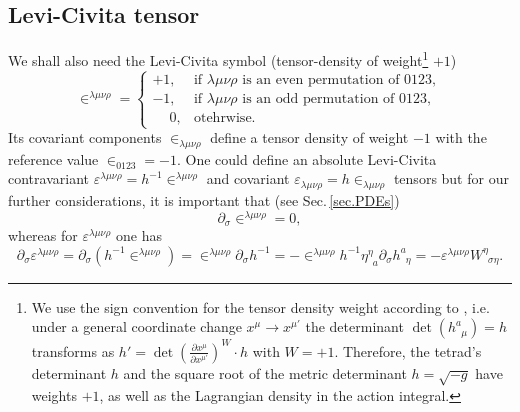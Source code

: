 \documentclass[
10pt, %
a4paper, %
oneside, %
headinclude,footinclude, %
BCOR5mm, %
]{scrartcl}
\newcommand{\pd}[1]{\partial_{#1}}
\newcommand{\tetrsymbol}{h}
\newcommand{\itetrsymbol}{\eta}
\newcommand{\itetr}[2]{\itetrsymbol^{#1}_{\phantom{#1}#2}}
\newcommand{\tetr}[2]{\tetrsymbol^{#1}_{\phantom{#1}#2}}
\newcommand{\detTetr}{\tetrsymbol}
\newcommand{\D}[1]{\partial_{#1}} %
\newcommand{\w}[2]{W^{#1}_{\phantom{#1}#2}}
\newcommand{\LCsymb}{\bm{\in}}    %
\newcommand{\LCtens}{\varepsilon} %
\begin{document}
\subsection{Levi-Civita tensor}


We shall also need the Levi-Civita symbol (tensor-density of weight\footnote{We 
	use the 
	sign convention for the tensor density weight according to \cite{Ryder2009,Grinfeld2013}, i.e.
	under a 
	general 
	coordinate change $ x^\mu \to x^{\mu'} $ the determinant $ \det(\tetr{a}{\mu}) = \detTetr $ 
	transforms as $ \detTetr' = \det \left(\frac{\partial x^\mu}{\partial x^{\mu'}} \right)^W 
	\cdot \detTetr $ with $ W=+1 $. Therefore, the tetrad's determinant $ \detTetr $ and the 
	square root of the metric determinant $ \detTetr = \sqrt{-g} $ have weights $ +1 $, as well as 
	the Lagrangian density in the action integral.} $ +1 $)
\begin{equation}\label{eqn.LCsymbol.def}
	\LCsymb^{\lambda\mu\nu\rho} = 
	\left\{ 
	\begin{array}{ll}
	 +1,	& \text{if \ }\lambda\mu\nu\rho \text{ is an even permutation of } 0123,\\[2mm]
     -1,	& \text{if \ }\lambda\mu\nu\rho \text{ is an odd \ permutation of } 0123,\\[2mm]
	  \phantom{-}0,	& \text{otehrwise}.
	\end{array}
	\right.
\end{equation}
Its covariant components $ \LCsymb_{\lambda\mu\nu\rho} $ define a tensor density of weight $ -1 $ 
with the reference value $ \LCsymb_{0123} = -1 $. One could define an absolute 
Levi-Civita 
contravariant $ \LCtens^{\lambda\mu\nu\rho} = h^{-1} \LCsymb^{\lambda\mu\nu\rho} $ 
and covariant $ \LCtens_{\lambda\mu\nu\rho} = h \LCsymb_{\lambda\mu\nu\rho} $ tensors  
but for our further considerations, it is important that 
(see Sec.\,\ref{sec.PDEs})
\begin{equation}\label{eqn.diff.LCsymb}
\D{\sigma}\LCsymb^{\lambda\mu\nu\rho} = 0,
\end{equation}
whereas for $ \LCtens^{\lambda\mu\nu\rho} $ one has
\begin{equation}\label{eqn.diff.LeviCivita}
\D{\sigma}\LCtens^{\lambda\mu\nu\rho} = 
\pd{\sigma}(\detTetr^{-1}\LCsymb^{\lambda\mu\nu\rho}) = 
\LCsymb^{\lambda\mu\nu\rho}\pd{\sigma}\detTetr^{-1} = 
-\LCsymb^{\lambda\mu\nu\rho}\detTetr^{-1}\itetr{\eta}{a}\pd{\sigma}\tetr{a}{\eta} = 
-\LCtens^{\lambda\mu\nu\rho}\w{\eta}{\sigma\eta}. 
\end{equation}
\end{document}
